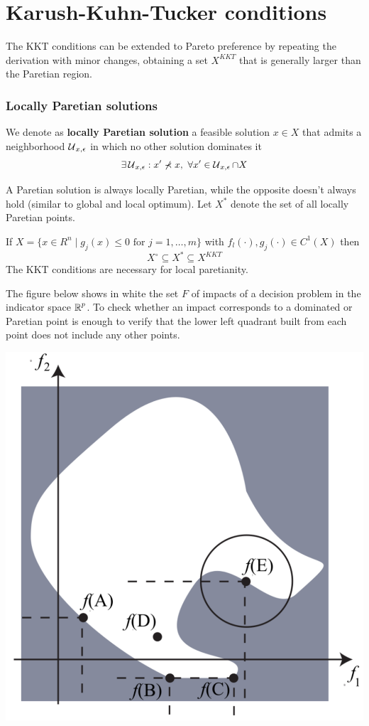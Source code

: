 \section{Karush-Kuhn-Tucker conditions}
\label{sec:kktcondforpareto}

The KKT conditions can be extended to Pareto preference by repeating the derivation with minor changes, obtaining a set $X^{KKT}$ that is generally larger than the Paretian region.

\subsubsection{Locally Paretian solutions}

\begin{definition}
	We denote as \textbf{locally Paretian solution} a feasible solution $x \in X$ that admits a neighborhood $\operatorname{\mathcal{U}}_{x, \epsilon}$ in which no other solution dominates it
	$$ \exists \U_{x, \epsilon} : x' \not \prec x, \ \forall x' \in \U_{x, \epsilon} \cap X $$
\end{definition}

A Paretian solution is always locally Paretian, while the opposite doesn't always hold (similar to global and local optimum). Let $X^\ast$ denote the set of all locally Paretian points. \\

\begin{theo}
	If $X = \{x \in R^n \mid g_j (x) \leq 0 \text{ for } j =1, \dots, m\}$ with $f_l (\cdot), g_j(\cdot) \in C^1 (X)$ then 
	$$ X^\circ \subseteq X^\ast \subseteq X^{KKT}$$
	The KKT conditions are necessary for local paretianity.
\end{theo}

The figure below shows in white the set $F$ of impacts of a decision problem in the indicator space $\operatorname{\mathbb{R}}^p$. To check whether an impact corresponds to a dominated or Paretian point is enough to verify that the lower left quadrant built from each point does not include any other points.
\begin{center}
	\includegraphics[width=0.5\columnwidth]{img/mcp/paretian/locpar}
\end{center}

